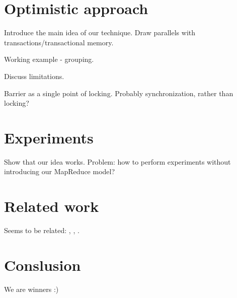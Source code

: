 \documentclass[10pt,conference,letterpaper]{IEEEtran}
\begin{document}
\section{Optimistic approach}
Introduce the main idea of our technique. Draw parallels with transactions/transactional memory. 

Working example - grouping. 

Discuss limitations.

Barrier as a single point of locking.  Probably synchronization, rather than locking?

\section{Experiments}
Show that our idea works. Problem: how to perform experiments without introducing our MapReduce model?

\section{Related work}
Seems to be related: \cite{4279071}, \cite{Wei:2009:SSO:1559845.1559973}, \cite{Mutschler:2014:ASP:2659232.2633686}.

\section{Conslusion}
We are winners :)



\end{document}
